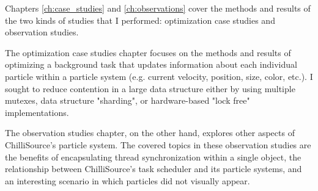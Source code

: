 Chapters \ref{ch:case_studies} and \ref{ch:observations} cover the methods and results of the two kinds of studies that I performed: optimization case studies and observation studies. 

The optimization case studies chapter focuses on the methods and results of optimizing a background task that updates information about each individual particle within a particle system (e.g. current velocity, position, size, color, etc.). I sought to reduce contention in a large data structure either by using multiple mutexes, data structure "sharding", or hardware-based "lock free" implementations. 

The observation studies chapter, on the other hand, explores other aspects of ChilliSource's particle system. The covered topics in these observation studies are the benefits of encapsulating thread synchronization within a single object, the relationship between ChilliSource's task scheduler and its particle systems, and an interesting scenario in which particles did not visually appear.

